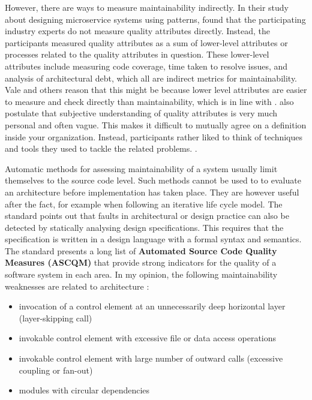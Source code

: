 \documentclass[utf8,english]{gradu3}
\begin{document}
However, there are ways to measure maintainability indirectly. In their study about
designing microservice systems using patterns, \textcite[9]{Vale2022} found that
the participating industry experts do not measure quality attributes directly.
Instead, the participants measured quality attributes as a sum of lower-level attributes or
processes related to the quality attributes in question. These lower-level
attributes include measuring code coverage, time taken to resolve issues, and
analysis of architectural debt, which all are indirect metrics for
maintainability. Vale and others reason that this might be because lower level
attributes are easier to measure and check directly than maintainability, which is 
in line with \textcite{Arvanitou2017}. \textcite[9]{Vale2022}
also postulate that subjective understanding of quality attributes is very much
personal and often vague. This makes it difficult to mutually agree on a
definition inside your organization. Instead, participants rather liked to think
of techniques and tools they used to tackle the related problems.
\parencite[7-10]{Vale2022}.

Automatic methods for assessing maintainability of a system usually limit
themselves to the source code level. Such methods cannot be used to to evaluate
an architecture before implementation has taken place. They are however useful
after the fact, for example when following an iterative life cycle model.
The standard \textcite[1-2]{ISO5055} points out that faults in architectural or design practice
can also be detected by statically analysing design specifications. This
requires that the specification is written in a design language with a formal
syntax and semantics. The standard presents a long list of
\textbf{Automated Source Code Quality Measures (ASCQM)} that provide strong
indicators for the quality of a software system in each area. In my opinion,
the following maintainability weaknesses are related to architecture
\parencite[38-47]{ISO5055}:
\begin{itemize}
  \item invocation of a control element at an unnecessarily deep horizontal
        layer (layer-skipping call)
  \item invokable control element with excessive file or data access operations
  \item invokable control element with large number of outward calls (excessive coupling
        or fan-out)
  \item modules with circular dependencies
\end{itemize}
\end{document}
